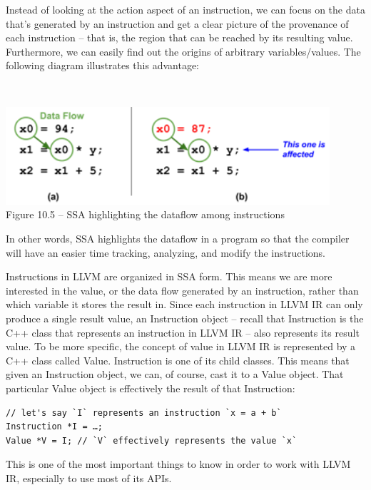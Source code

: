 Instead of looking at the action aspect of an instruction, we can focus on the data that's generated by an instruction and get a clear picture of the provenance of each instruction – that is, the region that can be reached by its resulting value. Furthermore, we can easily find out the origins of arbitrary variables/values. The following diagram illustrates this advantage:

\hspace*{\fill} \\ %
\begin{center}
\includegraphics[width=0.9\textwidth]{content/3/chapter10/images/5.png}\\
Figure 10.5 – SSA highlighting the dataflow among instructions
\end{center}

In other words, SSA highlights the dataflow in a program so that the compiler will have an easier time tracking, analyzing, and modify the instructions.

Instructions in LLVM are organized in SSA form. This means we are more interested in the value, or the data flow generated by an instruction, rather than which variable it stores the result in. Since each instruction in LLVM IR can only produce a single result value, an Instruction object – recall that Instruction is the C++ class that represents an instruction in LLVM IR – also represents its result value. To be more specific, the concept of value in LLVM IR is represented by a C++ class called Value. Instruction is one of its child classes. This means that given an Instruction object, we can, of course, cast it to a Value object. That particular Value object is effectively the result of that Instruction:

\begin{lstlisting}[style=styleCXX]
// let's say `I` represents an instruction `x = a + b`
Instruction *I = …;
Value *V = I; // `V` effectively represents the value `x`
\end{lstlisting}

This is one of the most important things to know in order to work with LLVM IR, especially to use most of its APIs.

